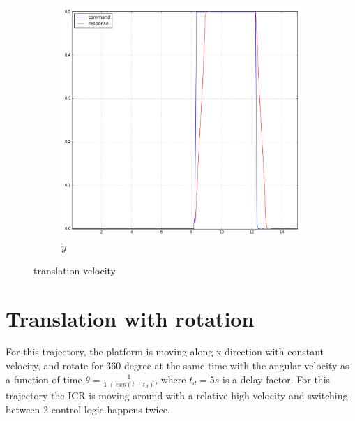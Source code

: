 \begin{figure}[!hb]
\begin{subfigure}[b]{0.49\textwidth}
         \includegraphics[width=1.1\textwidth]{Figures/90_y.png}
         \caption{$\dot{y}$}
         \label{fig:90Y}
     \end{subfigure}
     
        \caption{translation velocity}
        \label{fig:90}
\end{figure}



\section{Translation with rotation}
For this trajectory, the platform is moving along x direction with constant velocity, and rotate for 360 degree at the same time with the angular velocity as a function of time $\dot{\theta}=\frac{1}{1+exp(t-t_d)}$, where $t_d=5s$ is a delay factor. For this trajectory the ICR is moving around with a relative high velocity and switching between 2 control logic happens twice.
